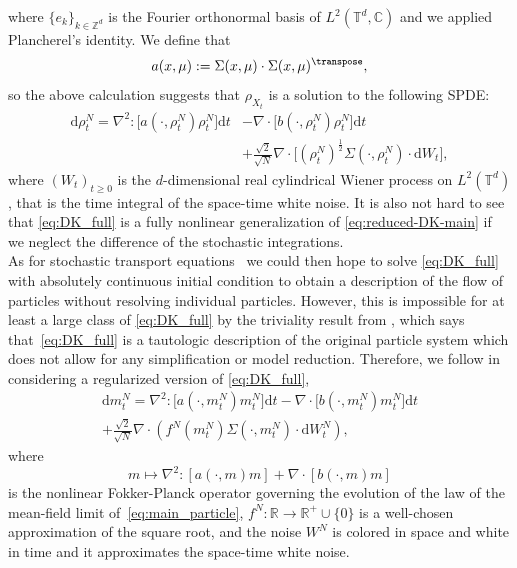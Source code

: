 where $\{e_k\}_{k \in \mathbb{Z}^d}$ is the Fourier orthonormal basis of $L^2(\mathbb{T}^d, \mathbb{C})$ and we applied Plancherel's identity. We define that
\begin{equation*}
    a(x,\mu) := \Sigma(x,\mu) \cdot \Sigma(x,\mu)^{\transpose},
\end{equation*}
so the above calculation suggests that $\rho_{X_t}$ is a solution to the following SPDE:
\begin{equation}\label{eq:DK_full}
\begin{split}
\mathrm{d}\rho^N_t =  \nabla^2 : \big[a(\cdot, \rho^N_t) \rho^N_t\big]\mathrm{d}t & - \nabla \cdot \big[ b(\cdot, \rho^N_t) \rho^N_t \big]\mathrm{d}t\\ & + \frac{\sqrt{2}}{\sqrt{N}}\nabla \cdot\big[(\rho^N_t)^{\frac{1}{2}} \Sigma (\cdot, \rho^N_t) \cdot \mathrm{d}W_t\big],
\end{split}
\end{equation}
where $(W_t)_{t \geq 0}$ is the $d$-dimensional real cylindrical Wiener process on $L^2(\mathbb{T}^d)$, that is the time integral of the space-time white noise. It is also not hard to see that \eqref{eq:DK_full} is a fully nonlinear generalization of \eqref{eq:reduced-DK-main} if we neglect the difference of the stochastic integrations.\\

As for stochastic transport equations~\cite{Kunita1990} we could then hope to solve \eqref{eq:DK_full} with absolutely continuous initial condition to obtain a description of the flow of particles without resolving individual particles.  However, this is impossible for at least a large class of \eqref{eq:DK_full} by the triviality result from \cite{KLvR19,KLvR20}, which says that~\eqref{eq:DK_full} is a tautologic description of the original particle system which does not allow for any simplification or model reduction. Therefore, we follow \cite{FG21,DKP23} in considering a regularized version of \eqref{eq:DK_full}, 
\begin{equation}\label{eq:DK_reg-intro}
\begin{split}
    \mathrm{d}m^N_t = \nabla^2: \big[a(\cdot, m^N_t) m^N_t\big]\mathrm{d}t - \nabla \cdot \big[ b(\cdot, m^N_t)m^N_t \big]\mathrm{d}t \\ + \frac{\sqrt{2}}{\sqrt{N}}\nabla \cdot (f^N(m^N_t) \Sigma (\cdot, m^N_t) \cdot \mathrm{d}W^N_t),
\end{split}
\end{equation}
where
$$
m \mapsto \nabla^2 :[ a(\cdot, m)m] + \nabla \cdot [ b(\cdot, m)m]
$$
is the nonlinear Fokker-Planck operator governing the evolution of the law of the mean-field limit of~\eqref{eq:main_particle}, $f^N: \mathbb{R} \to \mathbb{R}^+ \cup \{0\}$ is a well-chosen approximation of the square root, and the noise $W^N$ is colored in space and white in time and it approximates the space-time white noise.\\

